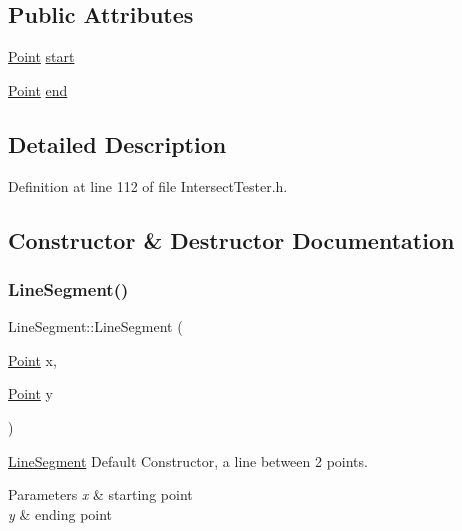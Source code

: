 \subsection*{Public Attributes}
\begin{DoxyCompactItemize}
\item 
\hyperlink{class_point}{Point} \hyperlink{class_line_segment_a91bddd96ae050a8255e3180c50f071f5}{start}
\item 
\hyperlink{class_point}{Point} \hyperlink{class_line_segment_acf33c308064ab9c60f47c11b5d23db06}{end}
\end{DoxyCompactItemize}


\subsection{Detailed Description}


Definition at line 112 of file Intersect\+Tester.\+h.



\subsection{Constructor \& Destructor Documentation}
\mbox{\label{class_line_segment_ad006d80e0d72c31734ff22d6c9dfed3d}} 
\subsubsection{\texorpdfstring{Line\+Segment()}{LineSegment()}}
{\footnotesize\ttfamily Line\+Segment\+::\+Line\+Segment (\begin{DoxyParamCaption}\item[{\hyperlink{class_point}{Point}}]{x,  }\item[{\hyperlink{class_point}{Point}}]{y }\end{DoxyParamCaption})\hspace{0.3cm}{\ttfamily [inline]}}



\hyperlink{class_line_segment}{Line\+Segment} Default Constructor, a line between 2 points. 


\begin{DoxyParams}{Parameters}
{\em x} & starting point \\
\hline
{\em y} & ending point \\
\hline
\end{DoxyParams}


